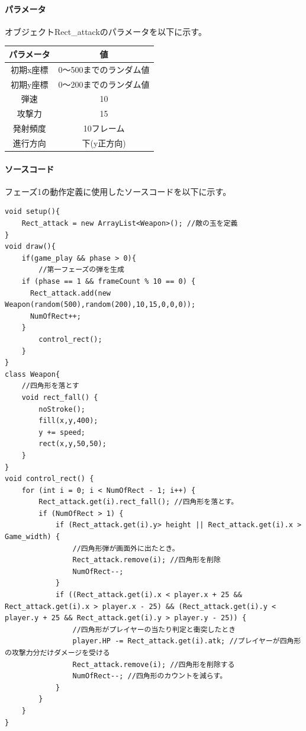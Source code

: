\documentclass[a4paper,titlepage,11pt]{ltjsarticle}
\begin{document}
\paragraph{パラメータ}
オブジェクトRect\_attackのパラメータを以下に示す。
\begin{table}[H]
	\centering
	\begin{tabular}{|c|c|}
		\hline
		パラメータ & 値 \\ \hline \hline
		初期x座標 & 0～500までのランダム値 \\ \hline
		初期y座標 & 0～200までのランダム値 \\ \hline
		弾速 & 10 \\ \hline
		攻撃力 & 15 \\ \hline
		発射頻度 & 10フレーム \\ \hline
		進行方向 & 下(y正方向) \\ \hline
	\end{tabular}
\end{table}

\paragraph{ソースコード}
フェーズ1の動作定義に使用したソースコードを以下に示す。
\begin{lstlisting}
void setup(){
	Rect_attack = new ArrayList<Weapon>(); //敵の玉を定義
}
void draw(){
	if(game_play && phase > 0){
		//第一フェーズの弾を生成
  	if (phase == 1 && frameCount % 10 == 0) {
  	  Rect_attack.add(new Weapon(random(500),random(200),10,15,0,0,0));
  	  NumOfRect++;
  	}
		control_rect();
	}	
}
class Weapon{
	//四角形を落とす
    void rect_fall() {
        noStroke();
        fill(x,y,400);
        y += speed;
        rect(x,y,50,50);
    }
}
void control_rect() {
    for (int i = 0; i < NumOfRect - 1; i++) {
        Rect_attack.get(i).rect_fall(); //四角形を落とす。
        if (NumOfRect > 1) {
            if (Rect_attack.get(i).y> height || Rect_attack.get(i).x > Game_width) {
                //四角形弾が画面外に出たとき。
                Rect_attack.remove(i); //四角形を削除
                NumOfRect--;
            }
            if ((Rect_attack.get(i).x < player.x + 25 && Rect_attack.get(i).x > player.x - 25) && (Rect_attack.get(i).y < player.y + 25 && Rect_attack.get(i).y > player.y - 25)) {
                //四角形がプレイヤーの当たり判定と衝突したとき
                player.HP -= Rect_attack.get(i).atk; //プレイヤーが四角形の攻撃力分だけダメージを受ける
                Rect_attack.remove(i); //四角形を削除する
                NumOfRect--; //四角形のカウントを減らす。
            }
        }
    }
}
\end{lstlisting}
\end{document}
